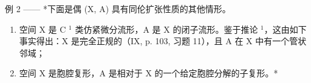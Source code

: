 例 2 —— *下面是偶 (X, A) 具有同伦扩张性质的其他情形。

\begin{enumerate}
\def\labelenumi{(\roman{enumi})}
\item
  空间 X 是 C \(^{1}\) 类仿紧微分流形，A 是 X 的闭子流形。鉴于推论 \(^{1}\)，这由如下事实得出：X 是完全正规的（IX, p. 103, 习题 11），且 A 在 X 中有一个管状邻域；
\item
  空间 X 是胞腔复形，A 是相对于 X 的一个给定胞腔分解的子复形。*
\end{enumerate}
\relax{}
